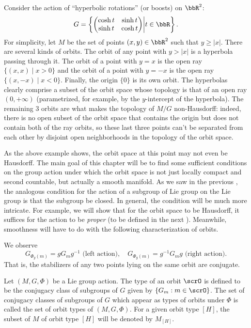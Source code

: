 \begin{example}
    Consider the action of ``hyperbolic rotations'' (or boosts) on $\bbR^2$:
    \[G=\left\{\begin{pmatrix}
    \cosh t & \sinh t\\
    \sinh t & \cosh t
    \end{pmatrix}\middle|t\in\bbR\right\}.\]
    For simplicity, let $M$ be the set of points $(x,y)\in\bbR^2$ such that $y\geq |x|$. There are several kinds of orbits. The orbit of any point with $y>|x|$ is a hyperbola passing through it. The orbit of a point with $y=x$  is the open ray $\{(x,x)\mid x>0\}$ and the orbit of a point with $y=-x$ is the open ray $\{(x,-x)\mid x<0\}$. Finally, the origin $\{0\}$ is its own orbit. The hyperbolas clearly comprise a subset of the orbit space whose topology is that of an open ray $(0,+\infty)$ (parametrized, for example, by the $y$-intercept of the hyperbola). The remaining $3$ orbits are what makes the topology of $M\slash G$ non-Hausdorff: indeed, there is no open subset of the orbit space that contains the origin but does not contain both of the ray orbits, so these last three points can't be separated from each other by disjoint open neighborhoods in the topology of the orbit space.
\end{example}

As the above example shows, the orbit space at this point may not even be Hausdorff. The main goal of this chapter will be to find some sufficient conditions on the group action under which the orbit space is not just locally compact and second countable, but actually a smooth manifold. As we saw in the previous \chap, the analogous condition for the action of a subgroup of Lie group on the Lie group is that the subgroup be closed. In general, the condition will be much more intricate. For example, we will show that for the orbit space to be Hausdorff, it suffices for the action to be \emph{proper} (to be defined in the next \sect). Meanwhile, smoothness will have to do with the following characterization of orbits.

We observe
\[G_{\Phi_g(m)}=gG_mg^{-1}\text{ (left action)}, \quad G_{\Phi_g(m)}=g^{-1}G_mg\text{ (right action)}.\]
That is, the stabilizers of any two points lying on the same orbit are conjugate.


\begin{defn}
    Let $(M,G,\Phi)$ be a Lie group action. The type of an orbit $\scrO$ is defined to be the conjugacy class of subgroups of $G$ given by $\{G_m:m\in \scrO\}$. The set of conjugacy classes of subgroups of $G$ which appear as types of orbits under $\Phi$ is called the set of orbit types of $(M,G,\Phi)$. For a given orbit type $[H]$, the subset of $M$ of orbit type $[H]$ will be denoted by $M_{[H]}$.
\end{defn}

